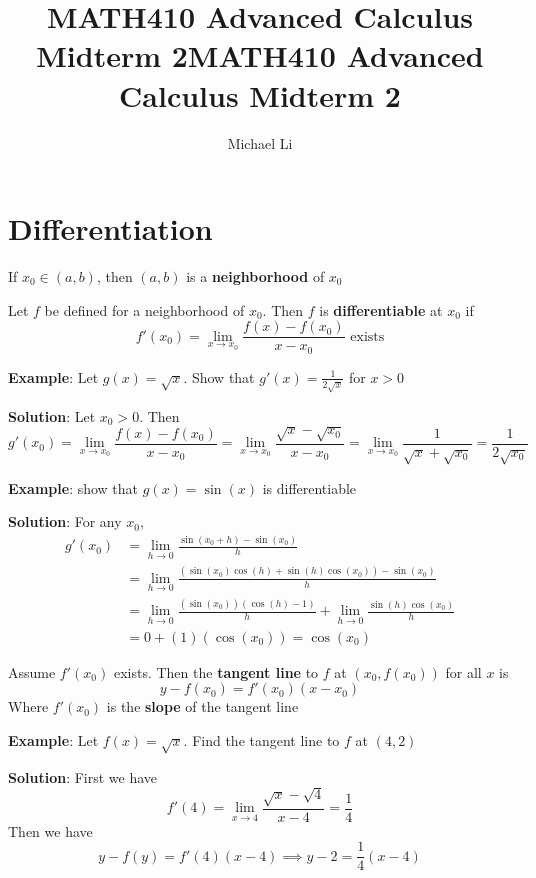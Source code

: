 \documentclass{article}
\date{}
\title{MATH410 Advanced Calculus Midterm 2}
\begin{document}
 
  \author{Michael Li}
  \title{MATH410 Advanced Calculus Midterm 2}
  \maketitle
  \tableofcontents
  \newpage
  \section{Differentiation}
  If $x_0 \in (a,b)$, then $(a,b)$ is a \textbf{neighborhood} of $x_0$

  Let $f$ be defined for a neighborhood of $x_0$. Then $f$ is \textbf{differentiable} at $x_0$ if
  \[f'(x_0) = \lim_{x \rightarrow x_0}\frac{f(x) - f(x_0)}{x - x_0} \text{ exists}\]

  \textbf{Example}: Let $g(x) = \sqrt{x}$. Show that $g'(x) = \frac{1}{2\sqrt{x}}$ for $x > 0$

  \textbf{Solution}: Let $x_0 > 0$. Then
  \[g'(x_0) = \lim_{x \rightarrow x_0}\frac{f(x) - f(x_0)}{x - x_0} = \lim_{x \rightarrow x_0} \frac{\sqrt{x} - \sqrt{x_0}}{x-x_0} = \lim_{x \rightarrow x_0} \frac{1}{\sqrt{x} + \sqrt{x_0}} = \frac{1}{2\sqrt{x_0}}\]

  \textbf{Example}: show that $g(x) = \sin(x)$ is differentiable

    \textbf{Solution}: For any $x_0$,
    \begin{align*}
      g'(x_0) &= \lim_{h \rightarrow 0}\frac{\sin(x_0 + h) - \sin(x_0)}{h} \\
              &= \lim_{h \rightarrow 0} \frac{(\sin(x_0)\cos(h) + \sin(h) \cos(x_0)) - \sin(x_0)}{h}\\
              &= \lim_{h \rightarrow 0} \frac{(\sin(x_0))(\cos(h) - 1)}{h} + \lim_{h \rightarrow 0} \frac{\sin(h)\cos(x_0)}{h} \\
              &= 0 + (1)(\cos(x_0)) = \cos(x_0)
    \end{align*}

    Assume $f'(x_0)$ exists. Then the \textbf{tangent line} to $f$ at $(x_0, f(x_0))$ for all $x$ is
    \[y - f(x_0) = f'(x_0)(x-x_0)\]
    Where $f'(x_0)$ is the \textbf{slope} of the tangent line

    \textbf{Example}: Let $f(x) = \sqrt{x}$. Find the tangent line to $f$ at $(4,2)$

    \textbf{Solution}: First we have
    \[f'(4) = \lim_{x \rightarrow 4} \frac{\sqrt{x} - \sqrt{4}}{x - 4} = \frac{1}{4}\]
    Then we have
    \[y - f(y) = f'(4)(x-4) \implies y - 2 = \frac{1}{4}(x-4)\] \bigskip
\end{document}
